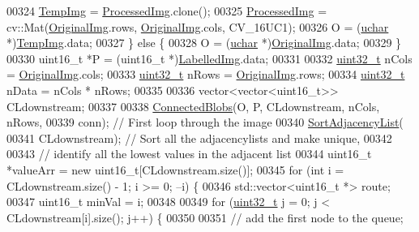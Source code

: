 \begin{DoxyCode}
00324     \hyperlink{class_vision_1_1_image_processing_a5371ad8d6f7aac9d43ee5c902ade7435}{TempImg} = \hyperlink{class_vision_1_1_image_processing_aa7d65742882cd1b2a1e4e9cb68809211}{ProcessedImg}.clone();
00325     \hyperlink{class_vision_1_1_image_processing_aa7d65742882cd1b2a1e4e9cb68809211}{ProcessedImg} = cv::Mat(\hyperlink{class_vision_1_1_image_processing_a77c370dab270158a4e9c634e2d3f48e7}{OriginalImg}.rows, \hyperlink{class_vision_1_1_image_processing_a77c370dab270158a4e9c634e2d3f48e7}{OriginalImg}.cols, CV\_16UC1);
00326     O = (\hyperlink{_soil_math_types_8h_a65f85814a8290f9797005d3b28e7e5fc}{uchar} *)\hyperlink{class_vision_1_1_image_processing_a5371ad8d6f7aac9d43ee5c902ade7435}{TempImg}.data;
00327   \} \textcolor{keywordflow}{else} \{
00328     O = (\hyperlink{_soil_math_types_8h_a65f85814a8290f9797005d3b28e7e5fc}{uchar} *)\hyperlink{class_vision_1_1_image_processing_a77c370dab270158a4e9c634e2d3f48e7}{OriginalImg}.data;
00329   \}
00330   uint16\_t *P = (uint16\_t *)\hyperlink{class_vision_1_1_segment_a4daa143f6cd4a753d3bbe45c6a67d27f}{LabelledImg}.data;
00331 
00332   \hyperlink{_soil_math_types_8h_a435d1572bf3f880d55459d9805097f62}{uint32\_t} nCols = \hyperlink{class_vision_1_1_image_processing_a77c370dab270158a4e9c634e2d3f48e7}{OriginalImg}.cols;
00333   \hyperlink{_soil_math_types_8h_a435d1572bf3f880d55459d9805097f62}{uint32\_t} nRows = \hyperlink{class_vision_1_1_image_processing_a77c370dab270158a4e9c634e2d3f48e7}{OriginalImg}.rows;
00334   \hyperlink{_soil_math_types_8h_a435d1572bf3f880d55459d9805097f62}{uint32\_t} nData = nCols * nRows;
00335 
00336   vector<vector<uint16\_t>> CLdownstream;
00337 
00338   \hyperlink{class_vision_1_1_segment_a77bbb909901188d02a42c7df29186289}{ConnectedBlobs}(O, P, CLdownstream, nCols, nRows,
00339                  conn); \textcolor{comment}{// First loop through the image}
00340   \hyperlink{class_vision_1_1_segment_a3d369e9d8b65dc96a3d4ac5ab8887960}{SortAdjacencyList}(
00341       CLdownstream); \textcolor{comment}{// Sort all the adjacencylists and make unique,}
00342 
00343   \textcolor{comment}{// identify all the lowest values in the adjacent list}
00344   uint16\_t *valueArr = \textcolor{keyword}{new} uint16\_t[CLdownstream.size()];
00345   \textcolor{keywordflow}{for} (\textcolor{keywordtype}{int} i = CLdownstream.size() - 1; i >= 0; --i) \{
00346     std::vector<uint16\_t *> route;
00347     uint16\_t minVal = i;
00348 
00349     \textcolor{keywordflow}{for} (\hyperlink{_soil_math_types_8h_a435d1572bf3f880d55459d9805097f62}{uint32\_t} j = 0; j < CLdownstream[i].size(); j++) \{
00350 
00351       \textcolor{comment}{// add the first node to the queue;}

\end{DoxyCode}
